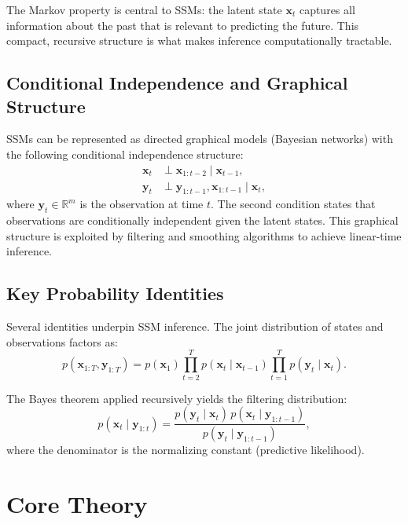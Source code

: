 \documentclass[conference]{IEEEtran}
\begin{document}
The Markov property is central to SSMs: the latent state $\mathbf{x}_t$ captures all information about the past that is relevant to predicting the future. This compact, recursive structure is what makes inference computationally tractable.

\subsection{Conditional Independence and Graphical Structure}

SSMs can be represented as directed graphical models (Bayesian networks) with the following conditional independence structure:
\begin{align}
\mathbf{x}_t &\perp \mathbf{x}_{1:t-2} \mid \mathbf{x}_{t-1}, \\
\mathbf{y}_t &\perp \mathbf{y}_{1:t-1}, \mathbf{x}_{1:t-1} \mid \mathbf{x}_t,
\end{align}
where $\mathbf{y}_t \in \mathbb{R}^m$ is the observation at time $t$. The second condition states that observations are conditionally independent given the latent states. This graphical structure is exploited by filtering and smoothing algorithms to achieve linear-time inference.

\subsection{Key Probability Identities}

Several identities underpin SSM inference. The joint distribution of states and observations factors as:
\begin{equation}
p(\mathbf{x}_{1:T}, \mathbf{y}_{1:T}) = p(\mathbf{x}_1) \prod_{t=2}^{T} p(\mathbf{x}_t \mid \mathbf{x}_{t-1}) \prod_{t=1}^{T} p(\mathbf{y}_t \mid \mathbf{x}_t).
\end{equation}

The Bayes theorem applied recursively yields the filtering distribution:
\begin{equation}
p(\mathbf{x}_t \mid \mathbf{y}_{1:t}) = \frac{p(\mathbf{y}_t \mid \mathbf{x}_t) \, p(\mathbf{x}_t \mid \mathbf{y}_{1:t-1})}{p(\mathbf{y}_t \mid \mathbf{y}_{1:t-1})},
\end{equation}
where the denominator is the normalizing constant (predictive likelihood).

\section{Core Theory}
\label{sec:theory}
\end{document}
